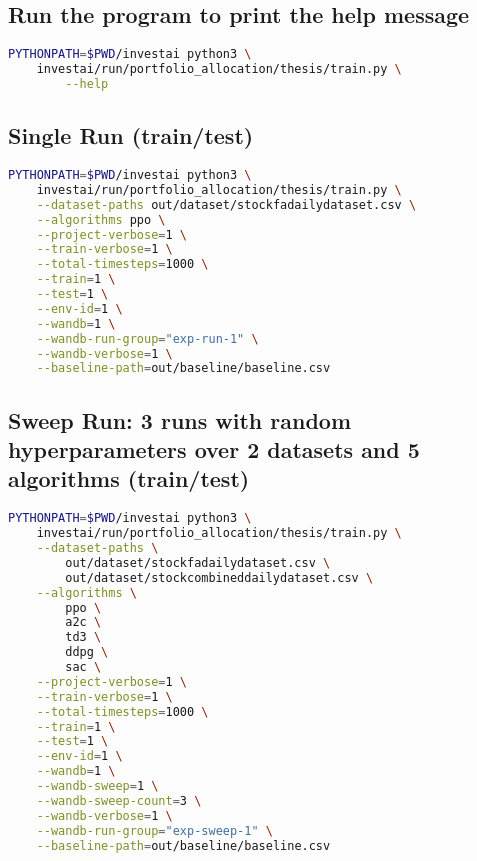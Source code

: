 \documentclass[../xlapes02]{subfiles}
\begin{document}
    \subsection{Run the program to print the help message}
    \begin{lstlisting}[language=bash]
PYTHONPATH=$PWD/investai python3 \
    investai/run/portfolio_allocation/thesis/train.py \
        --help
    \end{lstlisting}

    \subsection{Single Run (train/test)}
    \begin{lstlisting}[language=bash]
PYTHONPATH=$PWD/investai python3 \
    investai/run/portfolio_allocation/thesis/train.py \
    --dataset-paths out/dataset/stockfadailydataset.csv \
    --algorithms ppo \
    --project-verbose=1 \
    --train-verbose=1 \
    --total-timesteps=1000 \
    --train=1 \
    --test=1 \
    --env-id=1 \
    --wandb=1 \
    --wandb-run-group="exp-run-1" \
    --wandb-verbose=1 \
    --baseline-path=out/baseline/baseline.csv
    \end{lstlisting}

    \subsection{Sweep Run: 3 runs with random hyperparameters over 2 datasets and 5 algorithms (train/test)}
    \begin{lstlisting}[language=bash]
PYTHONPATH=$PWD/investai python3 \
    investai/run/portfolio_allocation/thesis/train.py \
    --dataset-paths \
        out/dataset/stockfadailydataset.csv \
        out/dataset/stockcombineddailydataset.csv \
    --algorithms \
        ppo \
        a2c \
        td3 \
        ddpg \
        sac \
    --project-verbose=1 \
    --train-verbose=1 \
    --total-timesteps=1000 \
    --train=1 \
    --test=1 \
    --env-id=1 \
    --wandb=1 \
    --wandb-sweep=1 \
    --wandb-sweep-count=3 \
    --wandb-verbose=1 \
    --wandb-run-group="exp-sweep-1" \
    --baseline-path=out/baseline/baseline.csv
    \end{lstlisting}
\end{document}
